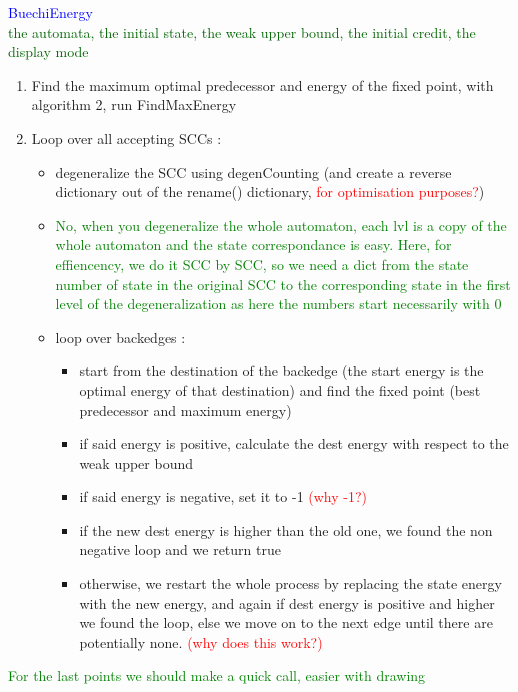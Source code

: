 \documentclass{rapport}
\newcommand{\pscrep}[1]{\textcolor{green}{#1}}
\begin{document}
\textcolor{blue}{BuechiEnergy}\\
\textcolor[HTML]{006400}{the automata, the initial state, the weak upper bound, the initial credit, the display mode}
\begin{enumerate}
    \item Find the maximum optimal predecessor and energy of the fixed point, with algorithm 2, run FindMaxEnergy
    \item Loop over all accepting SCCs :
    \begin{itemize}
        \item degeneralize the SCC using degenCounting (and create a reverse dictionary out of the rename() dictionary, \textcolor{red}{for optimisation purposes?})
        \item \pscrep{No, when you degeneralize the whole automaton, each lvl is a copy of the whole automaton
        and the state correspondance is easy. Here, for effiencency, we do it SCC by SCC, so we need a dict from the
        state number of state in the original SCC to the corresponding state in the first level of the 
        degeneralization as here the numbers start necessarily with 0}
        \item loop over backedges :
        \begin{itemize}
            \item start from the destination of the backedge (the start energy is the optimal energy of that destination) and find the fixed point (best predecessor and maximum energy)
            \item if said energy is positive, calculate the dest energy with respect to the weak upper bound
            \item if said energy is negative, set it to -1 \textcolor{red}{(why -1?)}
            \item if the new dest energy is higher than the old one, we found the non negative loop and we return true
            \item otherwise, we restart the whole process by replacing the state energy with the new energy, and again if dest energy is positive and  higher we found the loop, else we move on to the next edge until there are potentially none. \textcolor{red}{(why does this work?)}
        \end{itemize}
    \end{itemize}
\end{enumerate}
\pscrep{For the last points we should make a quick call, easier with drawing}
\newpage
\end{document}

